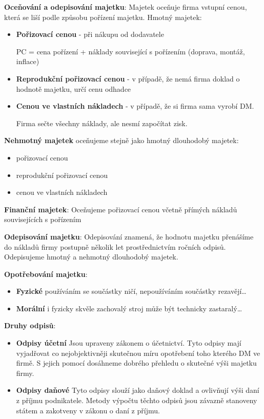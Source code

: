 \textbf{Oceňování a odepisování majetku}:
Majetek oceňuje firma vstupní cenou, která se liší podle způsobu pořízení majetku.
Hmotný majetek:
\begin{itemize}
    \item \textbf{Pořizovací cenou} - při nákupu od dodavatele \par PC = cena pořízení + náklady související s pořízením (doprava, montáž, inflace)
    \item \textbf{Reprodukční pořizovací cenou} - v případě, že nemá firma doklad o hodnotě majetku, určí cenu odhadce
    \item \textbf{Cenou ve vlastních nákladech} - v případě, že si firma sama vyrobí DM. \par Firma sečte všechny náklady, ale nesmí započítat zisk.
\end{itemize}

\textbf{Nehmotný majetek} oceňujeme stejně jako hmotný dlouhodobý majetek:
\begin{itemize}
    \item pořizovací cenou
    \item reprodukční pořizovací cenou
    \item cenou ve vlastních nákladech
\end{itemize}

\textbf{Finanční majetek}:
Oceňujeme pořizovací cenou včetně přímých nákladů souvisejících s pořízením

\textbf{Odepisování majetku}:
Odepisování znamená, že hodnotu majetku přenášíme do nákladů firmy postupně několik let prostřednictvím ročních odpisů. Odepisujeme hmotný a nehmotný dlouhodobý majetek.

\textbf{Opotřebování majetku}:
\begin{itemize}
    \item \textbf{Fyzické} používáním se součástky ničí, nepoužíváním součástky rezavějí\ldots
    \item \textbf{Morální} i fyzicky skvěle zachovalý stroj může být technicky zastaralý\ldots
\end{itemize}

\textbf{Druhy odpisů}:
\begin{itemize}
    \item \textbf{Odpisy účetní} Jsou upraveny zákonem o účetnictví. Tyto odpisy mají vyjadřovat co nejobjektivněji skutečnou míru opotřebení toho kterého DM ve firmě. S jejich pomocí dosáhneme dobrého přehledu o skutečné výši majetku firmy.
    \item \textbf{Odpisy daňové} Tyto odpisy slouží jako daňový doklad a ovlivňují výši daní z příjmu podnikatele. Metody výpočtu těchto odpisů jsou závazně stanoveny státem a zakotveny v zákonu o daní z příjmu.
\end{itemize}

